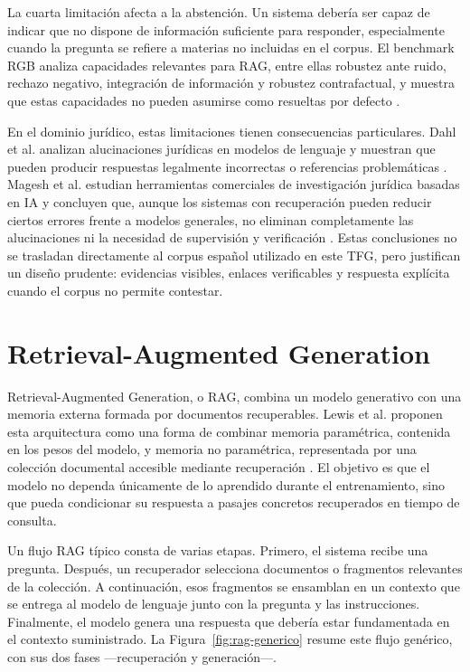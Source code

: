 La cuarta limitación afecta a la abstención. Un sistema debería ser capaz de indicar que no dispone de información suficiente para responder, especialmente cuando la pregunta se refiere a materias no incluidas en el corpus. El benchmark RGB analiza capacidades relevantes para RAG, entre ellas robustez ante ruido, rechazo negativo, integración de información y robustez contrafactual, y muestra que estas capacidades no pueden asumirse como resueltas por defecto \cite{chen2024rgb}.

En el dominio jurídico, estas limitaciones tienen consecuencias particulares. Dahl et al. analizan alucinaciones jurídicas en modelos de lenguaje y muestran que pueden producir respuestas legalmente incorrectas o referencias problemáticas \cite{dahl2024legalhallucinations}. Magesh et al. estudian herramientas comerciales de investigación jurídica basadas en IA y concluyen que, aunque los sistemas con recuperación pueden reducir ciertos errores frente a modelos generales, no eliminan completamente las alucinaciones ni la necesidad de supervisión y verificación \cite{magesh2025hallucinationfree}. Estas conclusiones no se trasladan directamente al corpus español utilizado en este TFG, pero justifican un diseño prudente: evidencias visibles, enlaces verificables y respuesta explícita cuando el corpus no permite contestar.

\section{Retrieval-Augmented Generation}
\label{sec:rag}

Retrieval-Augmented Generation, o RAG, combina un modelo generativo con una memoria externa formada por documentos recuperables. Lewis et al. proponen esta arquitectura como una forma de combinar memoria paramétrica, contenida en los pesos del modelo, y memoria no paramétrica, representada por una colección documental accesible mediante recuperación \cite{lewis2020rag}. El objetivo es que el modelo no dependa únicamente de lo aprendido durante el entrenamiento, sino que pueda condicionar su respuesta a pasajes concretos recuperados en tiempo de consulta.

Un flujo RAG típico consta de varias etapas. Primero, el sistema recibe una pregunta. Después, un recuperador selecciona documentos o fragmentos relevantes de la colección. A continuación, esos fragmentos se ensamblan en un contexto que se entrega al modelo de lenguaje junto con la pregunta y las instrucciones. Finalmente, el modelo genera una respuesta que debería estar fundamentada en el contexto suministrado. La Figura~\ref{fig:rag-generico} resume este flujo genérico, con sus dos fases —recuperación y generación—.

